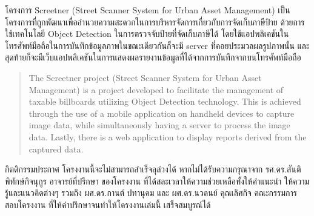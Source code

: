 \maketitle
\makesignature

\ifproject
\begin{abstractTH}
    โครงการ Screetner (Street Scanner System for Urban Asset Management) 
    เป็นโครงการที่ถูกพัฒนาเพื่ออำนวยความสะดวกในการบริหารจัดการเกี่ยวกับการจัดเก็บภาษีป้าย 
    ด้วยการใช้เทคโนโลยี Object Detection ในการตรวจจับป้ายที่จัดเก็บภาษีได้ 
    โดยใช้แอปพลิเคชันในโทรศัพท์มือถือในการบันทึกข้อมูลภาพในขณะเดียวกันก็จะมี server 
    ที่คอยประมวลผลรูปภาพนั้น และสุดท้ายก็จะมีเว็บแอปพลิเคชันในการแสดงผลรายงานข้อมูลที่ได้จากการบันทึกจากบนโทรศัพท์มือถือ
\end{abstractTH}

\begin{abstract}
    The Screetner project (Street Scanner System for Urban Asset Management) is 
    a project developed to facilitate the management of taxable billboards utilizing 
    Object Detection technology. This is achieved through the use of a mobile application 
    on handheld devices to capture image data, while simultaneously having a server to 
    process the image data. Lastly, there is a web application to display reports derived 
    from the captured data.
\end{abstract}

\iffalse
\begin{dedication}
This document is dedicated to all Chiang Mai University students.

Dedication page is optional.
\end{dedication}
\fi %

\begin{acknowledgments}
    กิตติกรรมประกาศ
    โครงงานนี้จะไม่สามารถสําเร็จลุล่วงได้ หากไม่ได้รับความกรุณาจาก รศ.ดร.สันติ พิทักษ์กิจนุกูร อาจารย์ที่ปรึกษา
    ของโครงงาน ที่ได้สละเวลาให้ความช่วยเหลือทั้งให้คําแนะนํา ให้ความรู้และแนวคิดต่างๆ รวมถึง ผศ.ดร.กานต์ ปทานุคม และ ผศ.ดร.นวดนย์ คุณเลิศกิจ คณะกรรมการสอบโครงงาน ที่ให้คําปรึกษาจนทําให้โครงงานเล่มนี้
    เสร็จสมบูรณ์ได้
\end{acknowledgments}%
\fi %

\contentspage

\ifproject
\figurelistpage
\fi %



